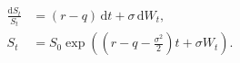 \documentclass{equation-sheet}
\begin{document}
\begin{equation*}
\begin{aligned}
\frac{\mathrm dS_t}{S_t} &= (r-q)\,\mathrm dt+\sigma\,\mathrm dW_t, \\
S_t &= S_0\exp\!\left(
  \left(r-q-\frac{\sigma^2}{2}\right)t+\sigma W_t
\right).
\end{aligned}
\end{equation*}
\end{document}
